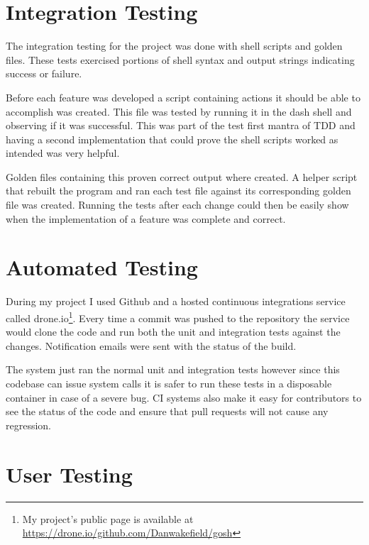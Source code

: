 \section{Integration Testing}
The integration testing for the project was done with shell scripts and golden files.
These tests exercised portions of shell syntax and output strings indicating success or failure.

Before each feature was developed a script containing actions it should be able to accomplish was created.
This file was tested by running it in the dash shell and observing if it was successful.
This was part of the test first mantra of TDD and having a second implementation that could prove the shell scripts worked as intended was very helpful.

Golden files containing this proven correct output where created.
A helper script that rebuilt the program and ran each test file against its corresponding golden file was created.
Running the tests after each change could then be easily show when the implementation of a feature was complete and correct.

\section{Automated Testing}
During my project I used Github and a hosted continuous integrations service called drone.io\footnote{My project's public page is available at \url{https://drone.io/github.com/Danwakefield/gosh}}.
Every time a commit was pushed to the repository the service would clone the code and run both the unit and integration tests against the changes.
Notification emails were sent with the status of the build.

The system just ran the normal unit and integration tests however since this codebase can issue system calls it is safer to run these tests in a disposable container in case of a severe bug.  
CI systems also make it easy for contributors to see the status of the code and ensure that pull requests will not cause any regression.

\section{User Testing}















